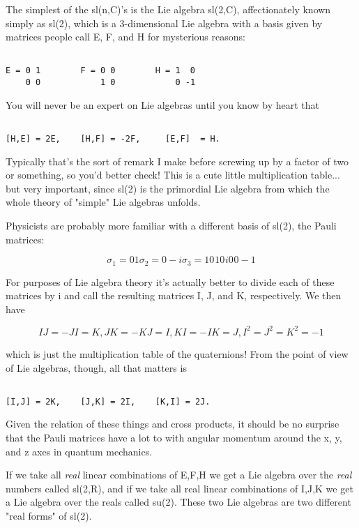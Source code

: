 The simplest of the sl(n,C)'s is the Lie algebra sl(2,C), affectionately
known simply as sl(2), which is a 3-dimensional Lie algebra with a
basis given by matrices people call E, F, and H for mysterious reasons:


\begin{verbatim}

E = 0 1        F = 0 0        H = 1  0 
    0 0            1 0            0 -1
\end{verbatim}
    

You will never be an expert on Lie algebras until you know by heart that


\begin{verbatim}

[H,E] = 2E,    [H,F] = -2F,     [E,F]  = H.
\end{verbatim}
    

Typically that's the sort of remark I make before screwing up by a
factor of two or something, so you'd better check!  This is a
cute little multiplication table... but very important, since sl(2) is
the primordial Lie algebra from which the whole theory of "simple" Lie
algebras unfolds.   

Physicists are probably more familiar with a different basis of sl(2),
the Pauli matrices:


$$

\sigma _{1} = 0 1       \sigma _{2} = 0 -i       \sigma _{3} = 1  0 
_{ }    1 0    _{ }       i  0  _{ }         0 -1
$$
    

For purposes of Lie algebra theory it's actually better to divide each of
these matrices by i and call the resulting matrices I, J, and K,
respectively.  We then have


$$

IJ = -JI = K,	JK = -KJ = I,    KI = -IK = J,   I^{2} = J^{2} = K^{2} = -1
$$
    

which is just the multiplication table of the quaternions!  From the
point of view of Lie algebras, though, all that matters is


\begin{verbatim}

[I,J] = 2K,    [J,K] = 2I,    [K,I] = 2J.
\end{verbatim}
    

Given the relation of these things and cross products, it should be no
surprise that the Pauli matrices have a lot to with angular momentum
around the x, y, and z axes in quantum mechanics.   

If we take all \emph{real} linear combinations of E,F,H we get a Lie algebra
over the \emph{real} numbers called sl(2,R), and if we take all real linear
combinations of I,J,K we get a Lie algebra over the reals called
su(2).  These two Lie algebras are two different "real forms" of sl(2).  

